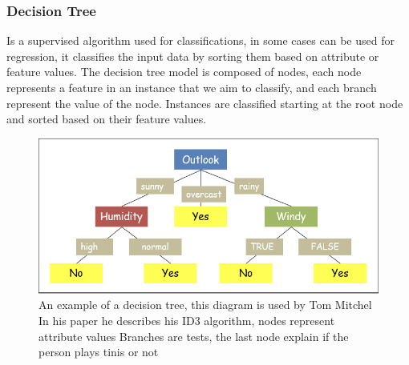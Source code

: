 \subsubsection{Decision Tree}
 Is a supervised algorithm used for classifications, in some cases can be used for regression, it classifies the input data by sorting them based on attribute or feature values. The decision tree model is composed of nodes, each node represents a feature in an instance that we aim to classify, and each branch represent the value of the node. Instances are classified starting at the root node and sorted based on their feature values. \cite{art5} \newpage
 \begin{figure}[!h]
     \centering
     \includegraphics[width=1\textwidth]{chapters/chapter02/fig02/dt.png}
     \caption{An example of a decision tree, this diagram is used by Tom Mitchel In his paper \cite{art14} he describes his ID3 algorithm, nodes represent attribute values Branches are tests, the last node explain if the person plays tinis or not}
     \label{fig:my_label}
 \end{figure} 
 
